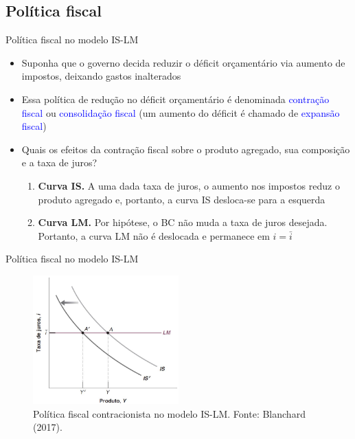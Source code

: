 \documentclass[10pt]{beamer}
\begin{document}
\subsection{Política fiscal}
\begin{frame}{Política fiscal no modelo IS-LM}
    \begin{itemize}
        \item Suponha que o governo decida reduzir o déficit orçamentário via aumento de impostos, deixando gastos inalterados
        \bigskip
        \item Essa política de redução no déficit orçamentário é denominada \textcolor{blue}{contração fiscal} ou \textcolor{blue}{consolidação fiscal} (um aumento do déficit é chamado de \textcolor{blue}{expansão fiscal})
        \bigskip
        \item Quais os efeitos da contração fiscal sobre o produto agregado, sua composição e a taxa de juros?
        \bigskip
        \begin{enumerate}
            \item \textbf{Curva IS.} A uma dada taxa de juros, o aumento nos impostos reduz o produto agregado e, portanto, a curva IS desloca-se para a esquerda
            \bigskip
            \item \textbf{Curva LM.} Por hipótese, o BC não muda a taxa de juros desejada. Portanto, a curva LM não é deslocada e permanece em $i = \bar{i}$
        \end{enumerate}
    \end{itemize}
\end{frame}

\begin{frame}{Política fiscal no modelo IS-LM}
    \begin{figure}
        \centering
        \includegraphics[width=0.5\textwidth]{./figures/aula082_fig5.JPG}
        \caption{Política fiscal contracionista no modelo IS-LM. Fonte: Blanchard (2017).}
        \label{fig7}
    \end{figure}
\end{frame}
\end{document}
